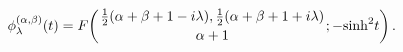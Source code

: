 \[\mathop{\phi^{(\alpha,\beta)}_{\lambda}\/}\nolimits\!\left(t\right)=\mathop{F%
\/}\nolimits\!\left({\tfrac{1}{2}(\alpha+\beta+1-i\lambda),\tfrac{1}{2}(\alpha%
+\beta+1+i\lambda)\atop\alpha+1};-{\mathop{\sinh\/}\nolimits^{2}}t\right).\]